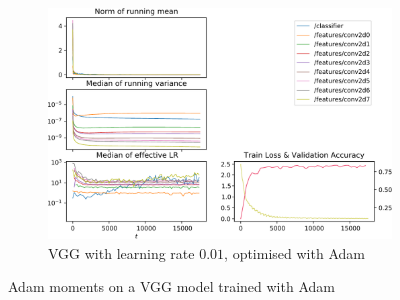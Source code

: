 \begin{figure}
    \begin{subfigure}{\textwidth}
        \centering
        \includegraphics[width=\linewidth]{gfx/diagrams/experiments/adam/vgg_adam_001_0_-1.pdf}
        \caption{VGG with learning rate $0.01$, optimised with Adam}
    \end{subfigure}
    \label{fig:vgg-experiment}
    \caption{Adam moments on a VGG model trained with Adam}
\end{figure}

